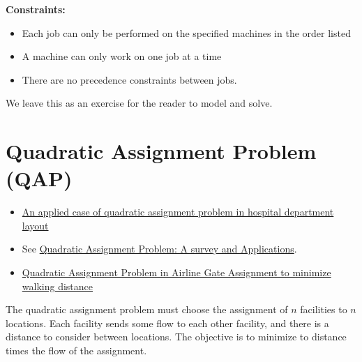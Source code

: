 {\textbf{Constraints:}
\begin{itemize}
    \item Each job can only be performed on the specified machines in the order listed
    \item A machine can only work on one job at a time
    \item There are no precedence constraints between jobs.
\end{itemize}
%

We leave this as an exercise for the reader to model and solve.

\section{Quadratic Assignment Problem (QAP)}
\begin{resource}{}{}
\begin{itemize}
\item \href{https://ieeexplore-ieee-org.ezproxy.lib.vt.edu/stamp/stamp.jsp?tp=&arnumber=7170278}{An applied case of quadratic assignment problem in hospital department layout}
\item See \href{https://www.semanticscholar.org/paper/Quadratic-Assignment-Problem%3A-A-survey-and-Shawky-Metwally/247b45613d6d3b6961fdad44f9e7fefb70fd3e82}{Quadratic Assignment Problem: A survey and Applications}.
\item \href{https://vtechworks.lib.vt.edu/server/api/core/bitstreams/06b13a4f-d1a9-452c-957f-b0bdd1619c76/content}{Quadratic Assignment Problem in Airline Gate Assignment to minimize walking distance}
\end{itemize}
\end{resource}
The quadratic assignment problem must choose the assignment of $n$ facilities to $n$ locations.  Each facility sends some flow to each other facility, and there is a distance to consider between locations.   
The objective is to minimize to distance times the flow of the assignment.


}
